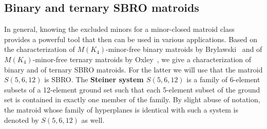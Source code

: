 \documentclass[11pt,a4paper]{article}
\theoremstyle{plain}
\theoremstyle{definition}
\begin{document}
\subsection{Binary and ternary SBRO matroids}

In general, knowing the excluded minors for a minor-closed matroid class provides a powerful tool that then can be used in various applications.  Based on the characterization of $M(K_4)$-minor-free binary matroids by Brylawski~\cite{brylawski1971combinatorial} and of $M(K_4)$-minor-free ternary matroids by Oxley~\cite{oxley1987characterization}, we give a characterization of binary and of ternary SBRO matroids. For the latter we will use that the matroid $S(5,6,12)$ is SBRO. The \textbf{Steiner system $S(5,6,12)$} is a family of 6-element subsets of a 12-element ground set such that each 5-element subset of the ground set is contained in exactly one member of the family. By slight abuse of notation, the matroid whose family of hyperplanes is identical with such a system is denoted by $S(5,6,12)$ as well.
\end{document}
